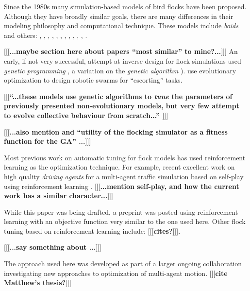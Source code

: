 \documentclass[letterpaper]{article}
\begin{document}
Since the 1980s many simulation-based models of bird flocks have been proposed. Although they have broadly similar goals, there are many differences in their modeling philosophy and computational technique. These models include \textit{boids} and others:
\citet{aoki_simulation_1982}, 
\citet{akira_okubo_dynamical_1986}, 
\citep{reynolds_flocks_1987},
\citep{tu_artificial_1994},
\citet{toner_flocks_1998}, 
\citet{heppner_stochastic_1990}, 
\citet{bajec_simulating_2005},
\citet{cucker_emergent_2007},
\citet{moskon_fuzzy_2007},
\citet{cavagna_seventh_2008},
\citet{bajec_organized_2009},
\citet{hoetzlein_flock2_2024}.


[[[\textbf{...maybe section here about papers ``most similar'' to mine?...}]]]
An early, if not very successful, attempt at inverse design for flock simulations \citep{reynolds_evolved_1993} used \textit{genetic programming} \citep{koza_genetic_1992}, a variation on the \textit{genetic algorithm} \citep{holland_adaptation_1975}). 
\citet{stolfi_escorting_2025} use evolutionary optimization to design robotic swarms for ``escorting'' tasks.

[[[\textbf{``...these models use genetic algorithms to \textit{tune} the parameters of previously presented non-evolutionary models, but very few attempt to evolve collective behaviour from scratch...'' \citep{demsar_evolution_2017}}]]]

[[[\textbf{...also mention \citep{stonedahl_finding_2011} and ``utility of the flocking simulator as a fitness function for the GA'' ...}]]]


Most previous work on automatic tuning for flock models has used reinforcement learning \citep{sutton_reinforcement_1998} as the optimization technique. For example, recent excellent work on high quality \textit{driving agents} for a multi-agent traffic simulation based on self-play using reinforcement learning \citep{cornelisse_building_2025}.
[[[\textbf{...mention self-play, and how the current work has a similar character...}]]]

While this paper was being drafted, a preprint was posted \citep{brambati_learning_2025} using reinforcement learning with an objective function very similar to the one used here. Other flock tuning based on reinforcement learning include:
[[[\textbf{cites?}]]].

[[[\textbf{...say something about \citep{jaderberg_human-level_2019}...}]]]

The approach used here was developed as part of a larger ongoing collaboration investigating new approaches to optimization of multi-agent motion. [[[\textbf{cite Matthew's thesis?}]]]
\end{document}

